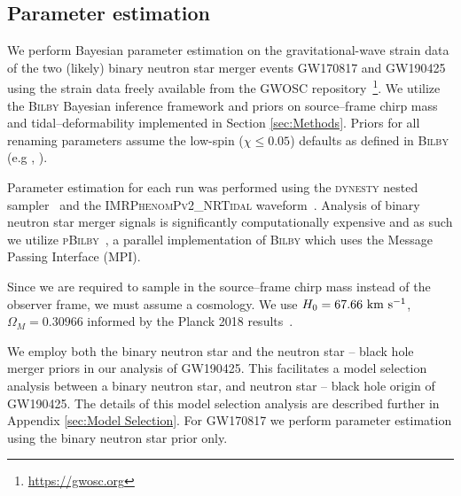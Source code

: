 \documentclass[twocolumn]{aastex631}
\begin{document}
\subsection{Parameter estimation}
We perform Bayesian parameter estimation on the gravitational-wave strain data of the two (likely) binary neutron star merger events GW170817 and GW190425 using the strain data freely available from the GWOSC repository~\footnote{\url{https://gwosc.org}}. 
We utilize the \textsc{Bilby} Bayesian inference framework and priors on source--frame chirp mass and tidal--deformability implemented in Section \ref{sec:Methods}. Priors for all renaming parameters assume the low-spin ($\chi \leq 0.05$) defaults as defined in \textsc{Bilby} (e.g \citealt{ashton19}, \citealt{romeroshaw20}).
	
Parameter estimation for each run was performed using the \textsc{dynesty} nested sampler~\citep{Dynesty} and the \textsc{IMRPhenomPv2\_NRTidal} waveform~\citep{IMRPhenomP_NRtidal}. Analysis of binary neutron star merger signals is significantly computationally expensive and as such we utilize \textsc{pBilby}~\citep{pbilby}, a parallel implementation of \textsc{Bilby} which uses the Message Passing Interface (MPI). 
	
Since we are required to sample in the source--frame chirp mass instead of the observer frame, we must assume a cosmology. We use $H_0=67.66 \rm  \ km  \ s^{-1}$, $\Omega_M = 0.30966 $ informed by the Planck 2018 results~\citep{Planck}.  
	
We employ both the binary neutron star and the neutron star -- black hole merger priors in our analysis of GW190425. This facilitates a model selection analysis between a binary neutron star, and neutron star -- black hole origin of GW190425. The details of this model selection analysis are described further in Appendix \ref{sec:Model Selection}. 
For GW170817 we perform parameter estimation using the binary neutron star prior only. 
	
\end{document}
